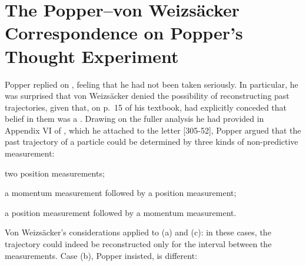 \documentclass[pdflatex]{sn-jnl}
\newcommand{\LdF}{\bt{Logik der Forschung}\xspace}
\newcommand{\vW}{von Weizsäcker\xspace}
\newcommand{\VW}{Von Weizsäcker\xspace}
\begin{document}
\section{The Popper--\vW Correspondence on Popper's Thought Experiment}

Popper replied on , feeling that he had not been taken seriously. In particular, he was surprised that \vW denied the possibility of reconstructing past trajectories, given that, on p.~15 of his textbook, \citet{Heisenberg1930} had explicitly conceded that belief in them was a . Drawing on the fuller analysis he had provided in Appendix VI of \LdF, which he attached to the letter [305-52], Popper argued that the past trajectory of a particle could be determined by three kinds of non-predictive measurement: \begin{inparaenum}[(a)] \item two position measurements; \item a momentum measurement followed by a position measurement; \item a position measurement followed by a momentum measurement. \end{inparaenum} \VW's considerations applied to (a) and (c): in these cases, the trajectory could indeed be reconstructed only for the interval between the measurements. Case (b), Popper insisted, is different:
\end{document}
